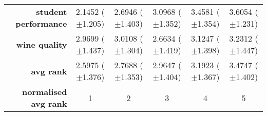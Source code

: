 \begin{table}[htb]
{\begin{tabular}{r|ccccc}
			\textbf{student performance} & \cellcolor[rgb]{ .388,  .745,  .482}2.1452 ($\pm$1.205) & \cellcolor[rgb]{ .741,  .843,  .502}2.6946 ($\pm$1.403) & \cellcolor[rgb]{ 1,  .922,  .518}3.0968 ($\pm$1.352)    & \cellcolor[rgb]{ .984,  .561,  .451}3.4581 ($\pm$1.354) & \cellcolor[rgb]{ .973,  .412,  .42}3.6054 ($\pm$1.231)  \\
			\textbf{wine quality}        & \cellcolor[rgb]{ .925,  .898,  .51}2.9699 ($\pm$1.437)  & \cellcolor[rgb]{ 1,  .922,  .518}3.0108 ($\pm$1.304)    & \cellcolor[rgb]{ .388,  .745,  .482}2.6634 ($\pm$1.419) & \cellcolor[rgb]{ .988,  .659,  .471}3.1247 ($\pm$1.398) & \cellcolor[rgb]{ .973,  .412,  .42}3.2312 ($\pm$1.447)  \\
			\midrule
			\textbf{avg rank}            & \cellcolor[rgb]{ .388,  .745,  .482}2.5975 ($\pm$1.376) & \cellcolor[rgb]{ .671,  .824,  .498}2.7688 ($\pm$1.353) & \cellcolor[rgb]{ 1,  .922,  .518}2.9647 ($\pm$1.404)    & \cellcolor[rgb]{ .988,  .694,  .475}3.1923 ($\pm$1.367) & \cellcolor[rgb]{ .973,  .412,  .42}3.4747 ($\pm$1.402)  \\
			\midrule
			\textbf{normalised avg rank} & \cellcolor[rgb]{ .388,  .745,  .482}1                   & \cellcolor[rgb]{ .694,  .831,  .498}2                   & \cellcolor[rgb]{ 1,  .922,  .518}3                      & \cellcolor[rgb]{ .988,  .667,  .471}4                   & \cellcolor[rgb]{ .973,  .412,  .42}5                    \\
		\end{tabular}%

	}
\end{table}%

